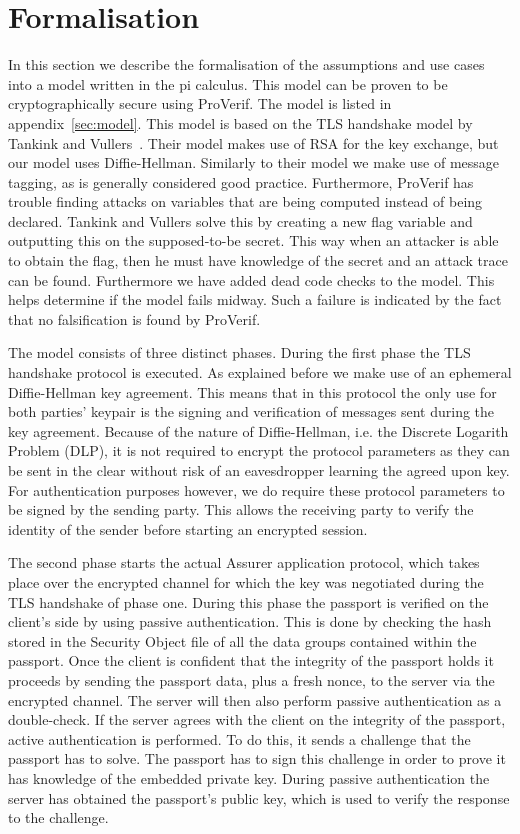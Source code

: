 \section{Formalisation}
In this section we describe the formalisation of the assumptions and use cases into a model written in the pi calculus. This model can be proven to be cryptographically secure using ProVerif. The model is listed in appendix~\ref{sec:model}. This model is based on the TLS handshake model by Tankink and Vullers~\cite{tankink2008verification}. Their model makes use of RSA for the key exchange, but our model uses Diffie-Hellman. Similarly to their model we make use of message tagging, as is generally considered good practice. Furthermore, ProVerif has trouble finding attacks on variables that are being computed instead of being declared. Tankink and Vullers solve this by creating a new flag variable and outputting this on the supposed-to-be secret. This way when an attacker is able to obtain the flag, then he must have knowledge of the secret and an attack trace can be found. Furthermore we have added dead code checks to the model. This helps determine if the model fails midway. Such a failure is indicated by the fact that no falsification is found by ProVerif.

The model consists of three distinct phases. During the first phase the TLS handshake protocol is executed. As explained before we make use of an ephemeral Diffie-Hellman key agreement. This means that in this protocol the only use for both parties' keypair is the signing and verification of messages sent during the key agreement. Because of the nature of Diffie-Hellman, i.e. the Discrete Logarith Problem (DLP), it is not required to encrypt the protocol parameters as they can be sent in the clear without risk of an eavesdropper learning the agreed upon key. For authentication purposes however, we do require these protocol parameters to be signed by the sending party. This allows the receiving party to verify the identity of the sender before starting an encrypted session.

The second phase starts the actual Assurer application protocol, which takes place over the encrypted channel for which the key was negotiated during the TLS handshake of phase one. During this phase the passport is verified on the client's side by using passive authentication. This is done by checking the hash stored in the Security Object file of all the data groups contained within the passport. Once the client is confident that the integrity of the passport holds it proceeds by sending the passport data, plus a fresh nonce, to the server via the encrypted channel. The server will then also perform passive authentication as a double-check. If the server agrees with the client on the integrity of the passport, active authentication is performed. To do this, it sends a challenge that the passport has to solve. The passport has to sign this challenge in order to prove it has knowledge of the embedded private key. During passive authentication the server has obtained the passport's public key, which is used to verify the response to the challenge.

